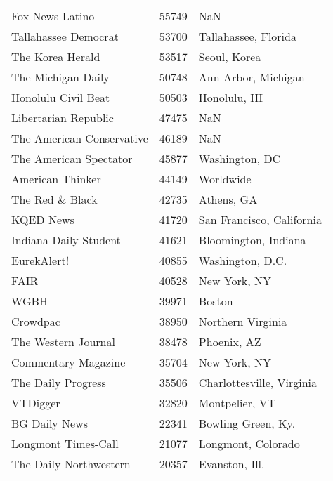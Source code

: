 \begin{longtable}{lrl}
	Fox News Latino &      55749 &                                   NaN \\
	Tallahassee Democrat &      53700 &                  Tallahassee, Florida \\
	The Korea Herald &      53517 &                         Seoul, Korea  \\
	The Michigan Daily &      50748 &                   Ann Arbor, Michigan \\
	Honolulu Civil Beat &      50503 &                          Honolulu, HI \\
	Libertarian Republic &      47475 &                                   NaN \\
	The American Conservative &      46189 &                                   NaN \\
	The American Spectator &      45877 &                        Washington, DC \\
	American Thinker &      44149 &                             Worldwide \\
	The Red \& Black &      42735 &                            Athens, GA \\
	KQED News &      41720 &             San Francisco, California \\
	Indiana Daily Student &      41621 &                  Bloomington, Indiana \\
	EurekAlert! &      40855 &                      Washington, D.C. \\
	FAIR &      40528 &                          New York, NY \\
	WGBH &      39971 &                                Boston \\
	Crowdpac &      38950 &                     Northern Virginia \\
	The Western Journal &      38478 &                           Phoenix, AZ \\
	Commentary Magazine &      35704 &                          New York, NY \\
	The Daily Progress &      35506 &             Charlottesville, Virginia \\
	VTDigger &      32820 &                        Montpelier, VT \\
	BG Daily News &      22341 &                    Bowling Green, Ky. \\
	Longmont Times-Call &      21077 &                    Longmont, Colorado \\
	The Daily Northwestern &      20357 &                        Evanston, Ill. \\

\end{longtable}

